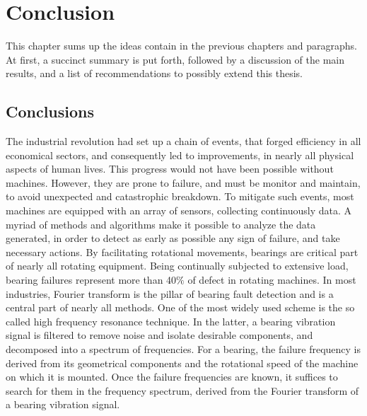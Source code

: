 \documentclass[../Main/thesis.tex]{subfiles}
\begin{document}
	\chapter[Conclusions]{Conclusion}
	\label{sec:conclusions}
	 This chapter sums up the ideas contain in the previous chapters and paragraphs. At first, a succinct summary is put forth, followed by a discussion of the main results, and a list of recommendations to possibly extend this thesis.
	
	\section{Conclusions}
	\label{sec:summary_and_conclusions}
	The industrial revolution had set up a chain of events, that forged efficiency in all economical sectors, and consequently led to improvements, in nearly all physical aspects of human lives. This progress would not have been possible without machines. However, they are prone to failure, and must be monitor and maintain, to avoid unexpected and catastrophic breakdown. To mitigate such events, most machines are equipped with an array of sensors, collecting continuously data. A myriad of methods and algorithms make it possible to analyze the data generated, in order to detect as early as possible any sign of failure, and take necessary actions.
	\justify
	By facilitating rotational movements, bearings are critical part of nearly all rotating equipment. Being continually subjected to extensive load, bearing failures represent more than 40$\%$ of defect in rotating machines. In most industries, Fourier transform is the pillar of bearing fault detection and is a central part of nearly all methods.
	One of the most widely used scheme is the so called high frequency resonance technique. 
	In the latter, a bearing vibration signal is filtered to remove noise and isolate desirable components, and decomposed into a spectrum of frequencies. For a bearing, the failure frequency is derived from its geometrical components and the rotational speed of the machine on which it is mounted. Once the failure frequencies are known, it suffices to search for them in the frequency spectrum, derived from the Fourier transform of a bearing vibration signal. 
\end{document}
